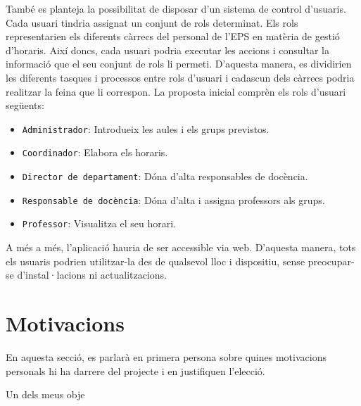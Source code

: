 \documentclass[a4paper,12pt]{ThesisStyle}
\begin{document}
També es planteja la possibilitat de disposar d'un sistema de control d'usuaris. Cada usuari tindria assignat un conjunt de rols determinat. Els rols representarien els diferents càrrecs del personal de l'EPS en matèria de gestió d'horaris. Així doncs, cada usuari podria executar les accions i consultar la informació que el seu conjunt de rols li permeti. D'aquesta manera, es dividirien les diferents tasques i processos entre rols d'usuari i cadascun dels càrrecs podria realitzar la feina que li correspon. La proposta inicial comprèn els rols d'usuari següents:
\begin{itemize}
  \item \texttt{Administrador}: Introdueix les aules i els grups previstos.
  \item \texttt{Coordinador}: Elabora els horaris.
  \item \texttt{Director de departament}: Dóna d'alta responsables de docència.
  \item \texttt{Responsable de docència}: Dóna d'alta i assigna professors als grups.
  \item \texttt{Professor}: Visualitza el seu horari.
\end{itemize}

A més a més, l'aplicació hauria de ser accessible via web. D'aquesta manera, tots els usuaris podrien utilitzar-la des de qualsevol lloc i dispositiu, sense preocupar-se d'instal·lacions ni actualitzacions.

\section{Motivacions}
\label{sec:motivacions}
En aquesta secció, es parlarà en primera persona sobre quines motivacions personals hi ha darrere del projecte i en justifiquen l'elecció.


Un dels meus obje

\end{document}
